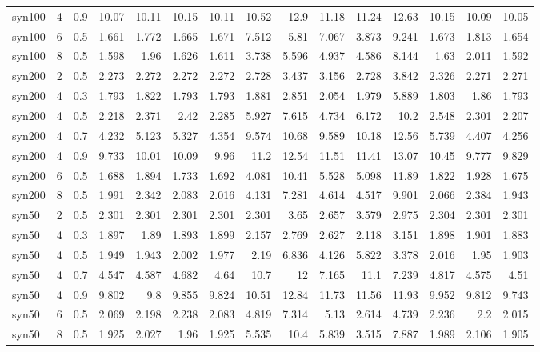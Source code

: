 \begin{table}
\begin{tabular}{lrrrrrrrrrrrrrr}
syn100 & 4 & 0.9 & 10.07 & 10.11 & 10.15 & 10.11 & 10.52 & 12.9 & 11.18 & 11.24 & 12.63 & 10.15 & 10.09 & 10.05 \\
syn100 & 6 & 0.5 & 1.661 & 1.772 & 1.665 & 1.671 & 7.512 & 5.81 & 7.067 & 3.873 & 9.241 & 1.673 & 1.813 & 1.654 \\
syn100 & 8 & 0.5 & 1.598 & 1.96 & 1.626 & 1.611 & 3.738 & 5.596 & 4.937 & 4.586 & 8.144 & 1.63 & 2.011 & 1.592 \\
syn200 & 2 & 0.5 & 2.273 & 2.272 & 2.272 & 2.272 & 2.728 & 3.437 & 3.156 & 2.728 & 3.842 & 2.326 & 2.271 & 2.271 \\
syn200 & 4 & 0.3 & 1.793 & 1.822 & 1.793 & 1.793 & 1.881 & 2.851 & 2.054 & 1.979 & 5.889 & 1.803 & 1.86 & 1.793 \\
syn200 & 4 & 0.5 & 2.218 & 2.371 & 2.42 & 2.285 & 5.927 & 7.615 & 4.734 & 6.172 & 10.2 & 2.548 & 2.301 & 2.207 \\
syn200 & 4 & 0.7 & 4.232 & 5.123 & 5.327 & 4.354 & 9.574 & 10.68 & 9.589 & 10.18 & 12.56 & 5.739 & 4.407 & 4.256 \\
syn200 & 4 & 0.9 & 9.733 & 10.01 & 10.09 & 9.96 & 11.2 & 12.54 & 11.51 & 11.41 & 13.07 & 10.45 & 9.777 & 9.829 \\
syn200 & 6 & 0.5 & 1.688 & 1.894 & 1.733 & 1.692 & 4.081 & 10.41 & 5.528 & 5.098 & 11.89 & 1.822 & 1.928 & 1.675 \\
syn200 & 8 & 0.5 & 1.991 & 2.342 & 2.083 & 2.016 & 4.131 & 7.281 & 4.614 & 4.517 & 9.901 & 2.066 & 2.384 & 1.943 \\
syn50 & 2 & 0.5 & 2.301 & 2.301 & 2.301 & 2.301 & 2.301 & 3.65 & 2.657 & 3.579 & 2.975 & 2.304 & 2.301 & 2.301 \\
syn50 & 4 & 0.3 & 1.897 & 1.89 & 1.893 & 1.899 & 2.157 & 2.769 & 2.627 & 2.118 & 3.151 & 1.898 & 1.901 & 1.883 \\
syn50 & 4 & 0.5 & 1.949 & 1.943 & 2.002 & 1.977 & 2.19 & 6.836 & 4.126 & 5.822 & 3.378 & 2.016 & 1.95 & 1.903 \\
syn50 & 4 & 0.7 & 4.547 & 4.587 & 4.682 & 4.64 & 10.7 & 12 & 7.165 & 11.1 & 7.239 & 4.817 & 4.575 & 4.51 \\
syn50 & 4 & 0.9 & 9.802 & 9.8 & 9.855 & 9.824 & 10.51 & 12.84 & 11.73 & 11.56 & 11.93 & 9.952 & 9.812 & 9.743 \\
syn50 & 6 & 0.5 & 2.069 & 2.198 & 2.238 & 2.083 & 4.819 & 7.314 & 5.13 & 2.614 & 4.739 & 2.236 & 2.2 & 2.015 \\
syn50 & 8 & 0.5 & 1.925 & 2.027 & 1.96 & 1.925 & 5.535 & 10.4 & 5.839 & 3.515 & 7.887 & 1.989 & 2.106 & 1.905 \\

\end{tabular}
\end{table}
